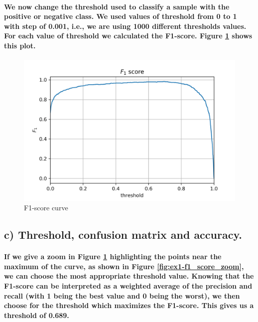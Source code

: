 \documentclass[a4paper]{article}    %
\begin{document}
\paragraph{We now change the threshold used to classify a sample with the positive or negative class. We used values of threshold from 0 to 1 with step of 0.001, i.e., we are using 1000 different thresholds values. For each value of threshold we calculated the F1-score. Figure \ref{fig:ex1-f1_score} shows this plot.}

\begin{figure}[H]
    \centering
    \includegraphics[width=12cm]{F1_score}
    \caption{F1-score curve}
    \label{fig:ex1-f1_score}
\end{figure}

\subsection{c) Threshold, confusion matrix and accuracy.}

\paragraph{If we give a zoom in Figure \ref{fig:ex1-f1_score} highlighting the points near the maximum of the curve, as shown in Figure \ref{fig:ex1-f1_score_zoom}, we can choose the most appropriate threshold value. Knowing that the F1-score can be interpreted as a weighted average of the precision and recall (with 1 being the best value and 0 being the worst), we then choose for the threshold which maximizes the F1-score. This gives us a threshold of 0.689.}
\end{document}
